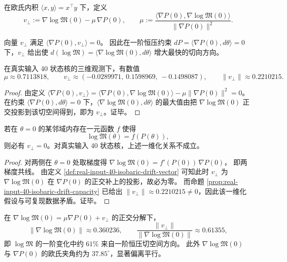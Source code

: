\begin{definition}[恒压漂移容量向量]\label{def:real-input-40-isobaric-drift-vector}
在欧氏内积 \(\langle x,y\rangle=x^\top y\) 下，定义
\[
v_\perp
:=\nabla\log\mathfrak{M}(0)-\mu\,\nabla P(0),
\qquad
\mu:=\frac{\langle\nabla P(0),\nabla\log\mathfrak{M}(0)\rangle}{\|\nabla P(0)\|^2}.
\]
\end{definition}

\begin{proposition}\label{prop:real-input-40-isobaric-drift-capacity}
向量 \(v_\perp\) 满足 \( \langle\nabla P(0),v_\perp\rangle=0\)。
因此在一阶恒压约束 \(dP=\langle\nabla P(0),d\theta\rangle=0\) 下，\(v_\perp\) 给出使 \(d(\log\mathfrak{M})=\langle\nabla\log\mathfrak{M}(0),d\theta\rangle\) 增大最快的切向方向。
\par
在真实输入 40 状态核的三维观测下，有数值
\[
\mu\approx 0.7113818,\qquad
v_\perp\approx(-0.0289971,\ 0.1598969,\ -0.1498087),
\qquad
\|v_\perp\|\approx 0.2210215.
\]
\end{proposition}
\begin{proof}
由定义 \(\langle\nabla P(0),v_\perp\rangle=\langle\nabla P(0),\nabla\log\mathfrak{M}(0)\rangle-\mu\|\nabla P(0)\|^2=0\)。
在约束 \(\langle\nabla P(0),d\theta\rangle=0\) 下，\(\langle\nabla\log\mathfrak{M}(0),d\theta\rangle\) 的最大值由把 \(\nabla\log\mathfrak{M}(0)\) 正交投影到该切空间得到，即为 \(v_\perp\)。证毕。
\end{proof}

\begin{corollary}\label{cor:real-input-40-logM-not-just-P}
若在 \(\theta=0\) 的某邻域内存在一元函数 \(f\) 使得
\[
\log\mathfrak{M}(\theta)=f(P(\theta)),
\]
则必有 \(v_\perp=0\)。对真实输入 40 状态核，上述一维化关系不成立。
\end{corollary}
\begin{proof}
对两侧在 \(\theta=0\) 处取梯度得
\(
\nabla\log\mathfrak{M}(0)=f'(P(0))\,\nabla P(0)
\)，
即两梯度共线。
由定义 \ref{def:real-input-40-isobaric-drift-vector} 可知此时 \(v_\perp\) 为 \(\nabla\log\mathfrak{M}(0)\) 在 \(\nabla P(0)\) 的正交补上的投影，故必为零。
而命题 \ref{prop:real-input-40-isobaric-drift-capacity} 已给出 \(\|v_\perp\|\approx 0.2210215\neq 0\)，因此该一维化假设与可复现数据矛盾。证毕。
\end{proof}

\begin{remark}\label{rem:real-input-40-vperp-angle}
在 \(\nabla\log\mathfrak{M}(0)=\mu\nabla P(0)+v_\perp\) 的正交分解下，
\[
\|\nabla\log\mathfrak{M}(0)\|\approx 0.360236,\qquad
\frac{\|v_\perp\|}{\|\nabla\log\mathfrak{M}(0)\|}\approx 0.61355,
\]
即 \(\log\mathfrak{M}\) 的一阶变化中约 \(61\%\) 来自一阶恒压切空间方向。
此外 \(\nabla\log\mathfrak{M}(0)\) 与 \(\nabla P(0)\) 的欧氏夹角约为 \(37.85^\circ\)，显著偏离平行。
\end{remark}

